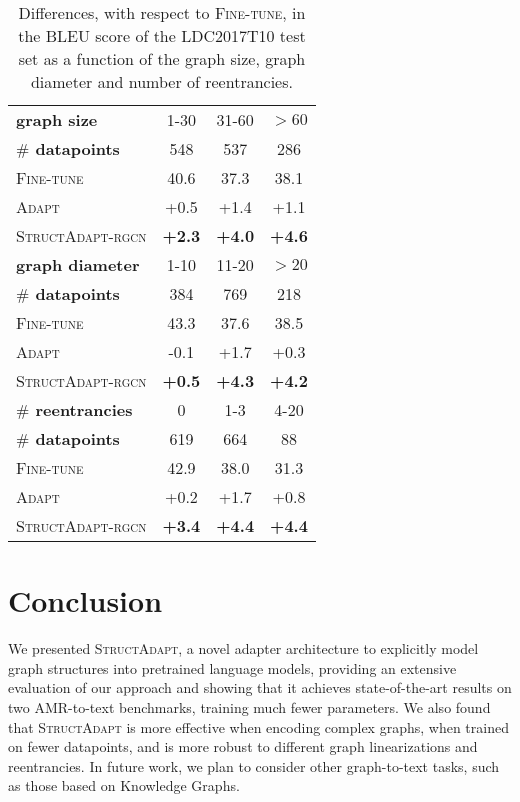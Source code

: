 \documentclass[11pt]{article}
\newcommand{\graphadapter}{{\small\textsc{StructAdapt}}\xspace}
\newcommand{\graphadapterrgcn}{{\small\textsc{StructAdapt-rgcn}}\xspace}
\newcommand{\vanilladapter}{{\small\textsc{Adapt}}\xspace}
\newcommand{\finetune}{{\small\textsc{Fine-tune}}\xspace}
\begin{document}
\begin{table}[t]
\small
\centering
{\renewcommand{\arraystretch}{0.9}

\begin{tabular}{lccc} 
\toprule
 \textbf{graph size}& 1-30 & 31-60 & ${>}60$  \\
 \textbf{$\#$ datapoints} & 548 & 537 & 286  \\
\midrule
\finetune & 40.6 & 37.3 & 38.1 \\
\vanilladapter  & +0.5 & +1.4 & +1.1 \\
\graphadapterrgcn  & \textbf{+2.3}  & \textbf{+4.0} & \textbf{+4.6} \\
\toprule
 \textbf{graph diameter}& 1-10 & 11-20 & ${>}20$  \\
 \textbf{$\#$ datapoints} & 384 & 769 & 218  \\
\midrule
\finetune & 43.3 & 37.6 & 38.5  \\
\vanilladapter  & -0.1 & +1.7 & +0.3 \\
\graphadapterrgcn  & \textbf{+0.5}  & \textbf{+4.3} & \textbf{+4.2} \\
\toprule
 \textbf{$\#$ reentrancies}& 0 & 1-3 & 4-20  \\
 \textbf{$\#$ datapoints} & 619 & 664 & 88  \\
\midrule
\finetune & 42.9 & 38.0 & 31.3 \\
\vanilladapter  & +0.2 & +1.7 & +0.8 \\
\graphadapterrgcn  & \textbf{+3.4}  & \textbf{+4.4} & \textbf{+4.4} \\
\bottomrule
\end{tabular}}
\caption{Differences, with respect to  \finetune, in the BLEU score of the LDC2017T10 test set as a function of the graph size, graph diameter and number of reentrancies.}
\label{tab:reentrances}

\end{table}


\section{Conclusion}

We presented \graphadapter, a novel adapter architecture to explicitly model graph structures into pretrained language models, providing an extensive evaluation of our approach and showing that it achieves state-of-the-art results on two AMR-to-text benchmarks, training much fewer parameters. We also found that \graphadapter is more effective when encoding complex graphs, when trained on fewer datapoints, and is more robust to different graph linearizations and reentrancies. In future work, we plan to consider other graph-to-text tasks, such as those based on Knowledge Graphs.
\end{document}
